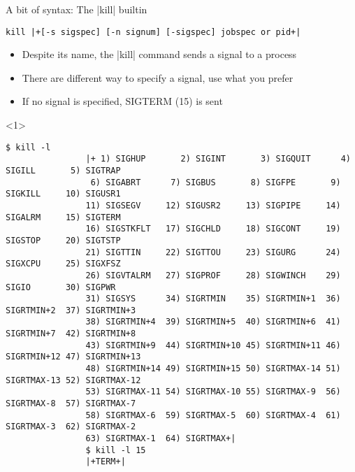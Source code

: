 \begin{frame}[fragile]{A bit of syntax: The \bash|kill| builtin}
    \vspace{-1mm}
    \begin{overlayarea}{\textwidth}{0.7\textheight}
        \begin{lstlisting}[style=MyBash, numbers=none, belowskip=-6mm]
            kill |+[-s sigspec] [-n signum] [-sigspec] jobspec or pid+|
        \end{lstlisting}
        \begin{itemize}
            \item Despite its name, the \bash|kill| command sends a signal to a process
            \item There are different way to specify a signal, use what you prefer
            \item If no signal is specified, SIGTERM (15) is sent
        \end{itemize}
        \begin{onlyenv}<1>
            \begin{lstlisting}[style=MyBash, style=smaller, numbers=none, xleftmargin=1mm]
                $ kill -l
                |+ 1) SIGHUP       2) SIGINT       3) SIGQUIT      4) SIGILL       5) SIGTRAP
                 6) SIGABRT      7) SIGBUS       8) SIGFPE       9) SIGKILL     10) SIGUSR1
                11) SIGSEGV     12) SIGUSR2     13) SIGPIPE     14) SIGALRM     15) SIGTERM
                16) SIGSTKFLT   17) SIGCHLD     18) SIGCONT     19) SIGSTOP     20) SIGTSTP
                21) SIGTTIN     22) SIGTTOU     23) SIGURG      24) SIGXCPU     25) SIGXFSZ
                26) SIGVTALRM   27) SIGPROF     28) SIGWINCH    29) SIGIO       30) SIGPWR
                31) SIGSYS      34) SIGRTMIN    35) SIGRTMIN+1  36) SIGRTMIN+2  37) SIGRTMIN+3
                38) SIGRTMIN+4  39) SIGRTMIN+5  40) SIGRTMIN+6  41) SIGRTMIN+7  42) SIGRTMIN+8
                43) SIGRTMIN+9  44) SIGRTMIN+10 45) SIGRTMIN+11 46) SIGRTMIN+12 47) SIGRTMIN+13
                48) SIGRTMIN+14 49) SIGRTMIN+15 50) SIGRTMAX-14 51) SIGRTMAX-13 52) SIGRTMAX-12
                53) SIGRTMAX-11 54) SIGRTMAX-10 55) SIGRTMAX-9  56) SIGRTMAX-8  57) SIGRTMAX-7
                58) SIGRTMAX-6  59) SIGRTMAX-5  60) SIGRTMAX-4  61) SIGRTMAX-3  62) SIGRTMAX-2
                63) SIGRTMAX-1  64) SIGRTMAX+|
                $ kill -l 15
                |+TERM+|
            \end{lstlisting}
        \end{onlyenv}

\end{overlayarea}
\end{frame}
